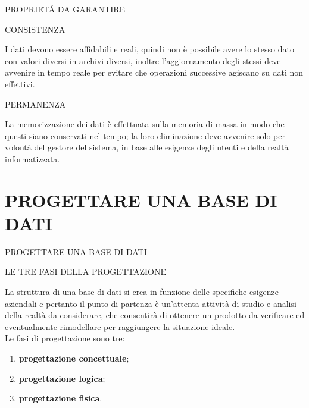 \documentclass[aspectratio=1610]{beamer}
\begin{document}
\begin{frame}{PROPRIET\'A DA GARANTIRE}
    \begin{alertblock}{CONSISTENZA}
        \begin{minipage}{0.98\linewidth}
            \justifying
            I dati devono essere affidabili e reali, quindi non è possibile avere lo stesso
            dato con valori diversi in archivi diversi, inoltre l'aggiornamento degli stessi
            deve avvenire in tempo reale per evitare che operazioni successive
            agiscano su dati non effettivi.
        \end{minipage}
    \end{alertblock}
    \pause
    \begin{alertblock}{PERMANENZA}
        \begin{minipage}{0.98\linewidth}
            \justifying
            La memorizzazione dei dati è effettuata sulla memoria di massa in modo che
            questi siano conservati nel tempo; la loro eliminazione deve avvenire solo
            per volontà del gestore del sistema, in base alle esigenze degli utenti e della
            realtà informatizzata.
        \end{minipage}
    \end{alertblock}
\end{frame}

\section{PROGETTARE UNA BASE DI DATI}

\begin{frame}{PROGETTARE UNA BASE DI DATI}
    \begin{alertblock}{LE TRE FASI DELLA PROGETTAZIONE}
        \begin{minipage}{0.98\linewidth}
            \justifying
            La struttura di una base di dati si crea in funzione delle specifiche esigenze
            aziendali e pertanto il punto di partenza è un’attenta attività di studio e analisi
            della realtà da considerare, che consentirà di ottenere un prodotto da
            verificare ed eventualmente rimodellare per raggiungere la situazione ideale.\\
            \pause
            Le fasi di progettazione sono tre:
            \begin{enumerate}
                \item \textbf{progettazione concettuale};
                \item \textbf{progettazione logica};
                \item \textbf{progettazione fisica}. 
            \end{enumerate}
        \end{minipage}
    \end{alertblock}
\end{frame}
\end{document}
